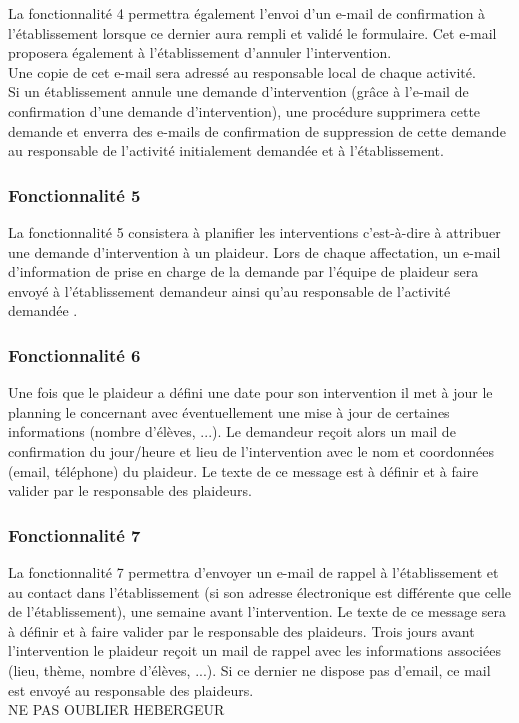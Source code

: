 La fonctionnalité 4 permettra également l'envoi d'un e-mail de confirmation à l'établissement lorsque ce dernier aura rempli et validé le formulaire. Cet e-mail proposera également à l'établissement d'annuler l'intervention. \\ Une copie de cet e-mail sera adressé au responsable local de chaque activité.\\

Si un établissement annule une demande d'intervention (grâce à l'e-mail de confirmation d'une demande d'intervention), une procédure supprimera cette demande et enverra des e-mails de confirmation de suppression de cette demande au responsable de l'activité initialement demandée et à l'établissement.  

\subsubsection{Fonctionnalité 5}
La fonctionnalité 5 consistera à planifier les interventions c'est-à-dire à attribuer une demande d'intervention à un plaideur.  
Lors de chaque affectation, un e-mail d'information de prise en charge de la demande par l'équipe de plaideur sera envoyé à l'établissement demandeur ainsi qu'au responsable de l'activité demandée .
\\

\subsubsection{Fonctionnalité 6}
Une fois que le plaideur a défini une date pour son intervention il met à jour le
planning le concernant avec éventuellement une mise à jour de certaines informations (nombre d'élèves, ...). Le demandeur reçoit alors un mail de confirmation du jour/heure et lieu de l'intervention avec le nom et coordonnées (email, téléphone) du plaideur. Le texte de ce message est à définir et à faire valider par le responsable des plaideurs. \\

\subsubsection{Fonctionnalité 7}
La fonctionnalité 7 permettra d'envoyer un e-mail de rappel à l'établissement et au contact dans l'établissement (si son adresse électronique est différente que celle de l'établissement), une semaine avant l'intervention.
Le texte de ce message sera à définir et à faire valider par le responsable des plaideurs. Trois jours avant l'intervention le plaideur reçoit un mail de rappel avec les informations associées (lieu, thème, nombre d'élèves, ...). Si ce dernier ne dispose pas d'email, ce mail est envoyé au responsable des plaideurs. 
\\
NE PAS OUBLIER HEBERGEUR
